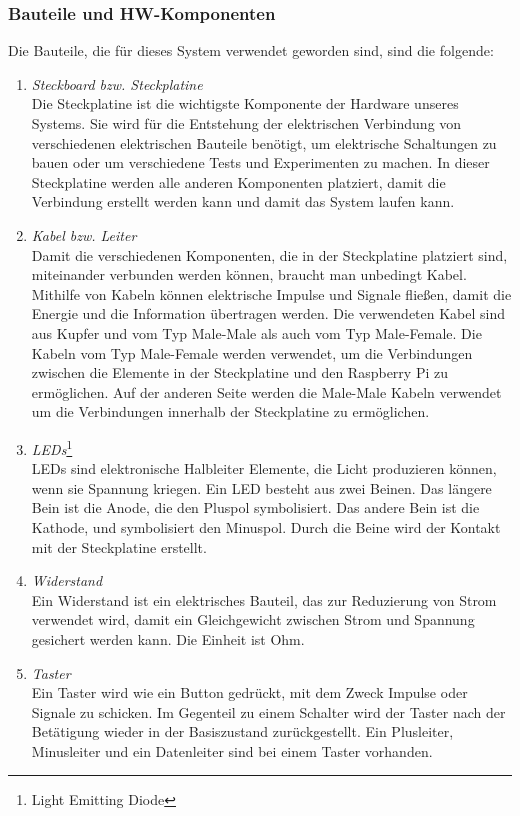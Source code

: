 \subsubsection{Bauteile und HW-Komponenten}
Die Bauteile, die für dieses System verwendet geworden sind, sind die folgende:
\begin{enumerate}
	\item \textit{Steckboard bzw. Steckplatine}\\ 
	Die Steckplatine ist die wichtigste Komponente der Hardware unseres Systems. Sie wird für die Entstehung der elektrischen Verbindung von verschiedenen elektrischen Bauteile benötigt, um elektrische Schaltungen zu bauen oder um verschiedene Tests und Experimenten zu machen. In dieser Steckplatine werden alle anderen Komponenten platziert, damit die Verbindung erstellt werden kann und damit das System laufen kann.
	\item \textit{Kabel bzw. Leiter} \\
	Damit die verschiedenen Komponenten, die in der Steckplatine platziert sind, miteinander verbunden werden können, braucht man unbedingt Kabel. Mithilfe von Kabeln können elektrische Impulse und Signale fließen, damit die Energie und die Information übertragen werden. Die verwendeten Kabel sind aus Kupfer und vom Typ Male-Male als auch vom Typ Male-Female. Die Kabeln vom Typ Male-Female werden verwendet, um die Verbindungen zwischen die Elemente in der Steckplatine und den Raspberry Pi zu ermöglichen. Auf der anderen Seite werden die Male-Male Kabeln verwendet um die Verbindungen innerhalb der Steckplatine zu ermöglichen.
	\item \textit{LEDs}\footnote{Light Emitting Diode} \\
	LEDs sind elektronische Halbleiter Elemente, die Licht produzieren können, wenn sie Spannung kriegen. Ein LED besteht aus zwei Beinen. Das längere Bein ist die Anode, die den Pluspol symbolisiert. Das andere Bein ist die Kathode, und symbolisiert den Minuspol. Durch die Beine wird der Kontakt mit der Steckplatine erstellt.
	\item \textit{Widerstand} \\
	Ein Widerstand ist ein elektrisches Bauteil, das zur Reduzierung von Strom verwendet wird, damit ein Gleichgewicht zwischen Strom und Spannung gesichert werden kann. Die Einheit ist Ohm.
	\item \textit{Taster} \\
	Ein Taster wird wie ein Button gedrückt, mit dem Zweck Impulse oder Signale zu schicken. Im Gegenteil zu einem Schalter wird der Taster nach der Betätigung  wieder in der Basiszustand zurückgestellt. Ein Plusleiter, Minusleiter und ein Datenleiter sind bei einem Taster vorhanden.

\end{enumerate}
